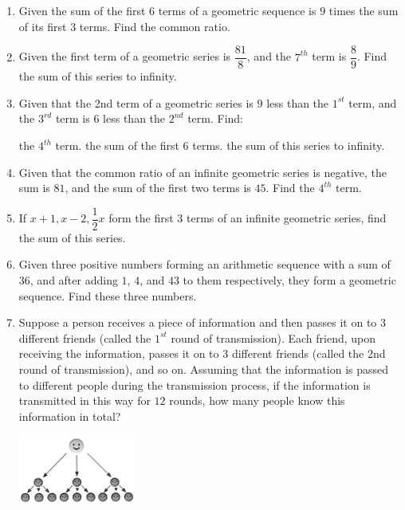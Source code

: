 \documentclass{report}
\begin{document}
\begin{enumerate}
            \item Given the sum of the first $6$ terms of a geometric sequence is $9$ times the sum of its first $3$ terms. Find the common ratio.

            \item Given the first term of a geometric series is $\dfrac{81}{8}$, and the $7^{th}$ term is $\dfrac{8}{9}$. Find the sum of this series to infinity.

            \item Given that the 2nd term of a geometric series is $9$ less than the $1^{st}$ term, and the $3^{rd}$ term is $6$ less than the $2^{nd}$ term. Find:
            \begin{tasks}[label=(\alph*)]
                \task the $4^{th}$ term.
                \task the sum of the first $6$ terms.
                \task the sum of this series to infinity.
            \end{tasks}

            \item Given that the common ratio of an infinite geometric series is negative, the sum is $81$, and the sum of the first two terms is $45$. Find the $4^{th}$ term.

            \item If $x+1, x-2, \dfrac{1}{2}x$ form the first $3$ terms of an infinite geometric series, find the sum of this series.
            
            \item Given three positive numbers forming an arithmetic sequence with a sum of $36$, and after adding $1$, $4$, and $43$ to them respectively, they form a geometric sequence. Find these three numbers.
            
            \newpage
            \item \begin{multicols}{2}
                Suppose a person receives a piece of information and then passes it on to $3$ different friends (called the $1^{st}$ round of transmission). Each friend, upon receiving the information, passes it on to $3$ different friends (called the 2nd round of transmission), and so on. Assuming that the information is passed to different people during the transmission process, if the information is transmitted in this way for $12$ rounds, how many people know this information in total?
                \columnbreak

                \begin{center}
                    \vspace*{1em}
                    \includegraphics[width=0.3\textwidth]{assets/13-10.jpg}
                \end{center}
            \end{multicols}
            

\end{enumerate}
\end{document}
